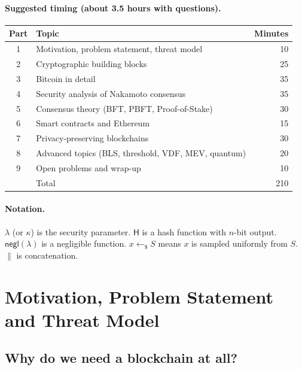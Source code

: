 \documentclass[11pt,a4paper]{article}
\theoremstyle{definition}
\theoremstyle{plain}
\theoremstyle{remark}
\newcommand{\Hash}{\mathsf{H}}
\newcommand{\negl}{\mathsf{negl}}
\begin{document}
\paragraph{Suggested timing (about 3.5 hours with questions).}
\begin{center}
\begin{tabular}{@{}clr@{}}
\toprule
Part & Topic & Minutes\\
\midrule
1 & Motivation, problem statement, threat model & 10\\
2 & Cryptographic building blocks & 25\\
3 & Bitcoin in detail & 35\\
4 & Security analysis of Nakamoto consensus & 35\\
5 & Consensus theory (BFT, PBFT, Proof-of-Stake) & 30\\
6 & Smart contracts and Ethereum & 15\\
7 & Privacy-preserving blockchains & 30\\
8 & Advanced topics (BLS, threshold, VDF, MEV, quantum) & 20\\
9 & Open problems and wrap-up & 10\\
\midrule
 & Total & 210\\
\bottomrule
\end{tabular}
\end{center}

\paragraph{Notation.} $\lambda$ (or $\kappa$) is the security parameter. $\Hash$ is a hash function with
$n$-bit output. $\negl(\lambda)$ is a negligible function. $x\leftarrow_{\$}S$ means $x$ is sampled
uniformly from $S$. $\|$ is concatenation.

\section{Motivation, Problem Statement and Threat Model}\label{sec:motivation}

\subsection{Why do we need a blockchain at all?}
\end{document}
